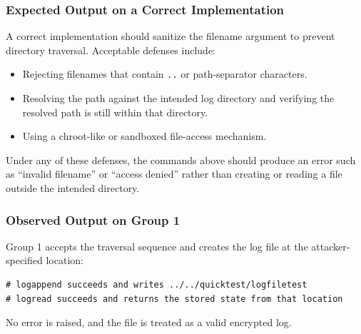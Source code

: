 \documentclass[a4paper, 12pt]{article}
\begin{document}
    \subsubsection{Expected Output on a Correct Implementation}
    A correct implementation should sanitize the filename argument to prevent directory traversal. Acceptable defenses include:
    \begin{itemize}
        \item Rejecting filenames that contain \texttt{..} or path-separator characters.
        \item Resolving the path against the intended log directory and verifying the resolved path is still within that directory.
        \item Using a chroot-like or sandboxed file-access mechanism.
    \end{itemize}
    Under any of these defenses, the commands above should produce an error such as ``invalid filename'' or ``access denied'' rather than creating or reading a file outside the intended directory.

    \subsubsection{Observed Output on Group 1}
    Group 1 accepts the traversal sequence and creates the log file at the attacker-specified location:
    \begin{lstlisting}
# logappend succeeds and writes ../../quicktest/logfiletest
# logread succeeds and returns the stored state from that location
    \end{lstlisting}
    No error is raised, and the file is treated as a valid encrypted log.
\end{document}
